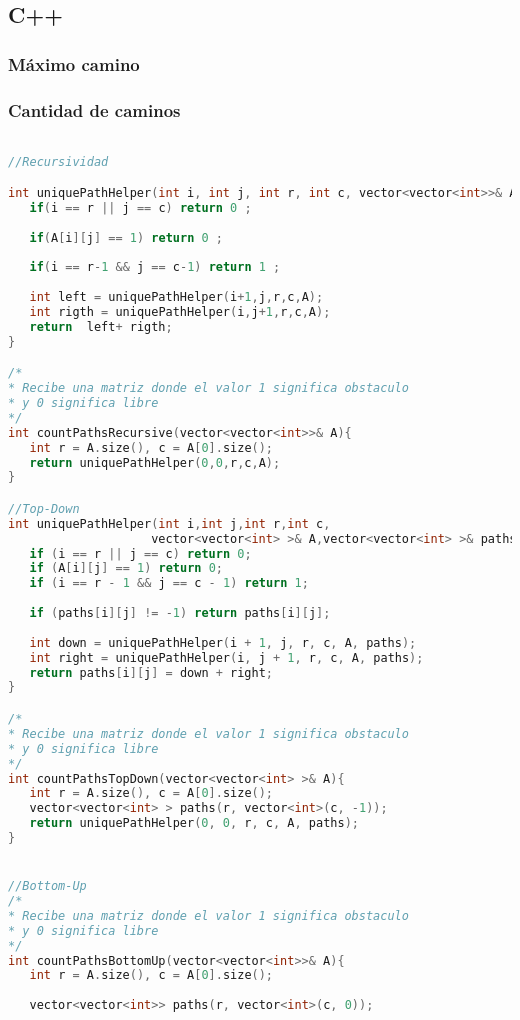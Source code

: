 \subsection{C++}
\subsubsection{Máximo camino}

\subsubsection{Cantidad de caminos}
\begin{lstlisting}[language=C++]

//Recursividad

int uniquePathHelper(int i, int j, int r, int c, vector<vector<int>>& A){
   if(i == r || j == c) return 0 ;
	
   if(A[i][j] == 1) return 0 ;
	
   if(i == r-1 && j == c-1) return 1 ;
	
   int left = uniquePathHelper(i+1,j,r,c,A);
   int rigth = uniquePathHelper(i,j+1,r,c,A); 	
   return  left+ rigth;
}

/*
* Recibe una matriz donde el valor 1 significa obstaculo
* y 0 significa libre
*/
int countPathsRecursive(vector<vector<int>>& A){
   int r = A.size(), c = A[0].size();
   return uniquePathHelper(0,0,r,c,A);
}

//Top-Down
int uniquePathHelper(int i,int j,int r,int c,
					vector<vector<int> >& A,vector<vector<int> >& paths){
   if (i == r || j == c) return 0;
   if (A[i][j] == 1) return 0;
   if (i == r - 1 && j == c - 1) return 1;
	
   if (paths[i][j] != -1) return paths[i][j];
   
   int down = uniquePathHelper(i + 1, j, r, c, A, paths);
   int right = uniquePathHelper(i, j + 1, r, c, A, paths); 	
   return paths[i][j] = down + right;
}

/*
* Recibe una matriz donde el valor 1 significa obstaculo
* y 0 significa libre
*/
int countPathsTopDown(vector<vector<int> >& A){
   int r = A.size(), c = A[0].size();
   vector<vector<int> > paths(r, vector<int>(c, -1));
   return uniquePathHelper(0, 0, r, c, A, paths);
}


//Bottom-Up
/*
* Recibe una matriz donde el valor 1 significa obstaculo
* y 0 significa libre
*/
int countPathsBottomUp(vector<vector<int>>& A){
   int r = A.size(), c = A[0].size();
	
   vector<vector<int>> paths(r, vector<int>(c, 0));
   

\end{lstlisting}
